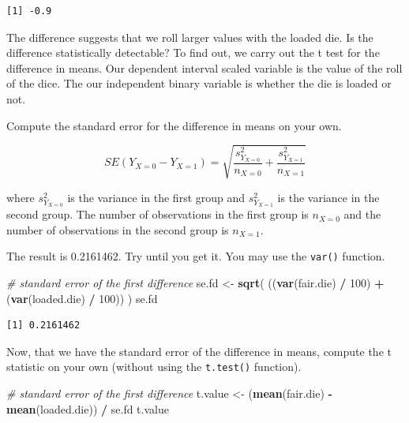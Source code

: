 \documentclass[]{article}
\newenvironment{Shaded}{\begin{snugshade}}{\end{snugshade}}
\newcommand{\KeywordTok}[1]{\textcolor[rgb]{0.13,0.29,0.53}{\textbf{#1}}}
\newcommand{\DecValTok}[1]{\textcolor[rgb]{0.00,0.00,0.81}{#1}}
\newcommand{\StringTok}[1]{\textcolor[rgb]{0.31,0.60,0.02}{#1}}
\newcommand{\CommentTok}[1]{\textcolor[rgb]{0.56,0.35,0.01}{\textit{#1}}}
\newcommand{\OperatorTok}[1]{\textcolor[rgb]{0.81,0.36,0.00}{\textbf{#1}}}
\newcommand{\NormalTok}[1]{#1}
\theoremstyle{definition}
\theoremstyle{definition}
\theoremstyle{definition}
\theoremstyle{remark}
\begin{document}
\begin{verbatim}
[1] -0.9
\end{verbatim}

The difference suggests that we roll larger values with the loaded die.
Is the difference statistically detectable? To find out, we carry out
the t test for the difference in means. Our dependent interval scaled
variable is the value of the roll of the dice. The our independent
binary variable is whether the die is loaded or not.

Compute the standard error for the difference in means on your own.

\[ SE(Y_{X=0} - Y_{X=1}) = \sqrt{ \frac{s_{Y_{X=0}}^2}{n_{X=0}} + \frac{s_{Y_{X=1}}^2}{n_{X=1}}}  \]

where \(s_{Y_{X=0}}^2\) is the variance in the first group and
\(s_{Y_{X=1}}^2\) is the variance in the second group. The number of
observations in the first group is \(n_{X=0}\) and the number of
observations in the second group is \(n_{X=1}\).

The result is 0.2161462. Try until you get it. You may use the
\texttt{var()} function.

\begin{Shaded}
\begin{Highlighting}[]
\CommentTok{# standard error of the first difference}
\NormalTok{se.fd <-}\StringTok{ }\KeywordTok{sqrt}\NormalTok{( ((}\KeywordTok{var}\NormalTok{(fair.die) }\OperatorTok{/}\StringTok{ }\DecValTok{100}\NormalTok{) }\OperatorTok{+}\StringTok{ }\NormalTok{(}\KeywordTok{var}\NormalTok{(loaded.die) }\OperatorTok{/}\StringTok{ }\DecValTok{100}\NormalTok{)) )}
\NormalTok{se.fd}
\end{Highlighting}
\end{Shaded}

\begin{verbatim}
[1] 0.2161462
\end{verbatim}

Now, that we have the standard error of the difference in means, compute
the t statistic on your own (without using the \texttt{t.test()}
function).

\begin{Shaded}
\begin{Highlighting}[]
\CommentTok{# standard error of the first difference}
\NormalTok{t.value <-}\StringTok{ }\NormalTok{(}\KeywordTok{mean}\NormalTok{(fair.die) }\OperatorTok{-}\StringTok{ }\KeywordTok{mean}\NormalTok{(loaded.die)) }\OperatorTok{/}\StringTok{ }\NormalTok{se.fd}
\NormalTok{t.value}
\end{Highlighting}
\end{Shaded}
\end{document}
